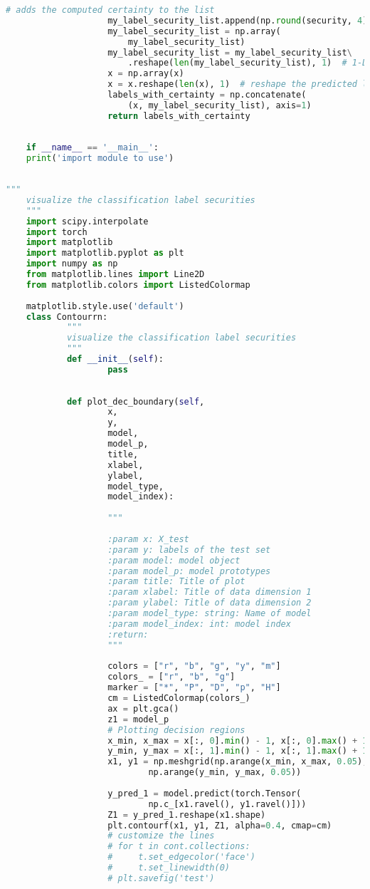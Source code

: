 \documentclass[english]{HSMW-Thesis}
\begin{document}
\begin{lstlisting}[caption=label\textunderscore security1.py ,style=chstyle, language=Python]
					# adds the computed certainty to the list
					my_label_security_list.append(np.round(security, 4))
					my_label_security_list = np.array(
						my_label_security_list)
					my_label_security_list = my_label_security_list\
						.reshape(len(my_label_security_list), 1)  # 1-D array reshape
					x = np.array(x)
					x = x.reshape(len(x), 1)  # reshape the predicted labels into 1-D array
					labels_with_certainty = np.concatenate(
						(x, my_label_security_list), axis=1)
					return labels_with_certainty
	
	
	if __name__ == '__main__':
	print('import module to use')
	
\end{lstlisting}

\newpage
\begin{lstlisting}[caption = contour.py, style=chstyle, language=Python]
	"""
	visualize the classification label securities
	"""
	import scipy.interpolate
	import torch
	import matplotlib
	import matplotlib.pyplot as plt
	import numpy as np
	from matplotlib.lines import Line2D
	from matplotlib.colors import ListedColormap
	
	matplotlib.style.use('default')
	class Contourrn:
			"""
			visualize the classification label securities
			"""
			def __init__(self):
					pass
					
					
			def plot_dec_boundary(self,
					x,
					y,
					model,
					model_p,
					title,
					xlabel,
					ylabel,
					model_type,
					model_index):
					
					"""
					
					:param x: X_test
					:param y: labels of the test set
					:param model: model object
					:param model_p: model prototypes
					:param title: Title of plot
					:param xlabel: Title of data dimension 1
					:param ylabel: Title of data dimension 2
					:param model_type: string: Name of model
					:param model_index: int: model index
					:return: 
					"""
	
					colors = ["r", "b", "g", "y", "m"]
					colors_ = ["r", "b", "g"]
					marker = ["*", "P", "D", "p", "H"]
					cm = ListedColormap(colors_)
					ax = plt.gca()
					z1 = model_p
					# Plotting decision regions
					x_min, x_max = x[:, 0].min() - 1, x[:, 0].max() + 1
					y_min, y_max = x[:, 1].min() - 1, x[:, 1].max() + 1
					x1, y1 = np.meshgrid(np.arange(x_min, x_max, 0.05),
							np.arange(y_min, y_max, 0.05))
	
					y_pred_1 = model.predict(torch.Tensor(
							np.c_[x1.ravel(), y1.ravel()]))
					Z1 = y_pred_1.reshape(x1.shape)
					plt.contourf(x1, y1, Z1, alpha=0.4, cmap=cm)
					# customize the lines
					# for t in cont.collections:
					#     t.set_edgecolor('face')
					#     t.set_linewidth(0)
					# plt.savefig('test')
	

\end{lstlisting}
\end{document}
